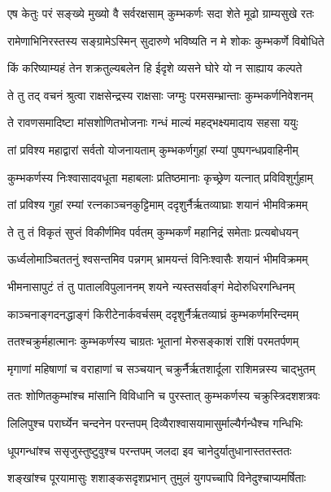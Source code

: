 \twolineshloka
{एष केतुः परं सङ्ख्ये मुख्यो वै सर्वरक्षसाम्}
{कुम्भकर्णः सदा शेते मूढो ग्राम्यसुखे रतः} %

\twolineshloka
{रामेणाभिनिरस्तस्य सङ्ग्रामेऽस्मिन् सुदारुणे}
{भविष्यति न मे शोकः कुम्भकर्णे विबोधिते} %

\twolineshloka
{किं करिष्याम्यहं तेन शक्रतुल्यबलेन हि}
{ईदृशे व्यसने घोरे यो न साह्याय कल्पते} %

\twolineshloka
{ते तु तद् वचनं श्रुत्वा राक्षसेन्द्रस्य राक्षसाः}
{जग्मुः परमसम्भ्रान्ताः कुम्भकर्णनिवेशनम्} %

\twolineshloka
{ते रावणसमादिष्टा मांसशोणितभोजनाः}
{गन्धं माल्यं महद्भक्ष्यमादाय सहसा ययुः} %

\twolineshloka
{तां प्रविश्य महाद्वारां सर्वतो योजनायताम्}
{कुम्भकर्णगुहां रम्यां पुष्पगन्धप्रवाहिनीम्} %

\twolineshloka
{कुम्भकर्णस्य निःश्वासादवधूता महाबलाः}
{प्रतिष्ठमानाः कृच्छ्रेण यत्नात् प्रविविशुर्गुहाम्} %

\twolineshloka
{तां प्रविश्य गुहां रम्यां रत्नकाञ्चनकुट्टिमाम्}
{ददृशुर्नैर्ऋतव्याघ्राः शयानं भीमविक्रमम्} %

\twolineshloka
{ते तु तं विकृतं सुप्तं विकीर्णमिव पर्वतम्}
{कुम्भकर्णं महानिद्रं समेताः प्रत्यबोधयन्} %

\twolineshloka
{ऊर्ध्वलोमाञ्चिततनुं श्वसन्तमिव पन्नगम्}
{भ्रामयन्तं विनिःश्वासैः शयानं भीमविक्रमम्} %

\twolineshloka
{भीमनासापुटं तं तु पातालविपुलाननम्}
{शयने न्यस्तसर्वाङ्गं मेदोरुधिरगन्धिनम्} %

\twolineshloka
{काञ्चनाङ्गदनद्धाङ्गं किरीटेनार्कवर्चसम्}
{ददृशुर्नैर्ऋतव्याघ्रं कुम्भकर्णमरिन्दमम्} %

\twolineshloka
{ततश्चक्रुर्महात्मानः कुम्भकर्णस्य चाग्रतः}
{भूतानां मेरुसङ्काशं राशिं परमतर्पणम्} %

\twolineshloka
{मृगाणां महिषाणां च वराहाणां च सञ्चयान्}
{चक्रुर्नैर्ऋतशार्दूला राशिमन्नस्य चाद्भुतम्} %

\twolineshloka
{ततः शोणितकुम्भांश्च मांसानि विविधानि च}
{पुरस्तात् कुम्भकर्णस्य चक्रुस्त्रिदशशत्रवः} %

\twolineshloka
{लिलिपुश्च परार्घ्येन चन्दनेन परन्तपम्}
{दिव्यैराश्वासयामासुर्माल्यैर्गन्धैश्च गन्धिभिः} %

\twolineshloka
{धूपगन्धांश्च ससृजुस्तुष्टुवुश्च परन्तपम्}
{जलदा इव चानेदुर्यातुधानास्ततस्ततः} %

\twolineshloka
{शङ्खांश्च पूरयामासुः शशाङ्कसदृशप्रभान्}
{तुमुलं युगपच्चापि विनेदुश्चाप्यमर्षिताः} %

